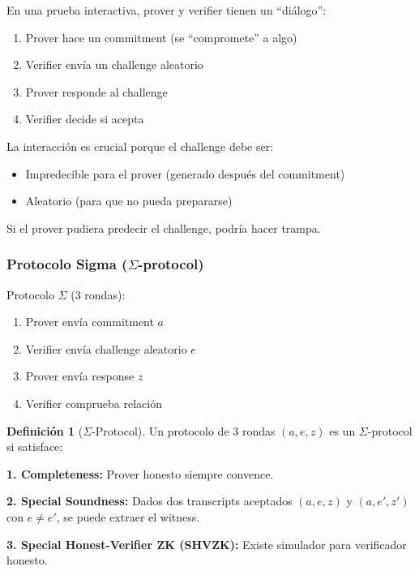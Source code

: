 \documentclass[11pt,a4paper,twoside,openright]{book}
\theoremstyle{definition}
\newtheorem{definition}{Definición}[chapter]
\theoremstyle{plain}
\theoremstyle{remark}
\begin{document}
\begin{intuicion}
En una prueba interactiva, prover y verifier tienen un ``diálogo'':
\begin{enumerate}
    \item Prover hace un commitment (se ``compromete'' a algo)
    \item Verifier envía un challenge aleatorio
    \item Prover responde al challenge
    \item Verifier decide si acepta
\end{enumerate}

La interacción es crucial porque el challenge debe ser:
\begin{itemize}
    \item Impredecible para el prover (generado después del commitment)
    \item Aleatorio (para que no pueda prepararse)
\end{itemize}

Si el prover pudiera predecir el challenge, podría hacer trampa.
\end{intuicion}

\subsubsection{Protocolo Sigma ($\Sigma$-protocol)}

Protocolo $\Sigma$ (3 rondas):
\begin{enumerate}
    \item Prover envía commitment $a$
    \item Verifier envía challenge aleatorio $e$
    \item Prover envía response $z$
    \item Verifier comprueba relación
\end{enumerate}

\begin{definition}[$\Sigma$-Protocol]
Un protocolo de 3 rondas $(a, e, z)$ es un $\Sigma$-protocol si satisface:

\textbf{1. Completeness:} Prover honesto siempre convence.

\textbf{2. Special Soundness:} Dados dos transcripts aceptados $(a, e, z)$ y $(a, e', z')$ con $e \neq e'$, se puede extraer el witness.

\textbf{3. Special Honest-Verifier ZK (SHVZK):} Existe simulador para verificador honesto.
\end{definition}
\end{document}
